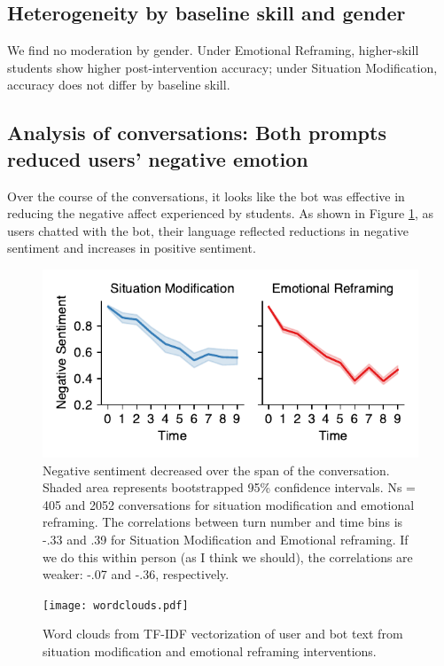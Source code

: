 \documentclass[11pt]{report}
\begin{document}
\begin{mainf}
\subsection{Heterogeneity by baseline skill and gender}

We find no moderation by gender. 
Under Emotional Reframing, higher-skill students show higher post-intervention accuracy; under Situation Modification, accuracy does not differ by baseline skill.

\subsection{Analysis of conversations: Both prompts reduced users' negative emotion}

Over the course of the conversations, it looks like the bot was effective in reducing the negative affect experienced by students. 
As shown in Figure \ref{fig:sentiment}, as users chatted with the bot, their language reflected reductions in negative sentiment and increases in positive sentiment.


\begin{figure}[ht]
    \centering
    \includegraphics[width=\linewidth]{sentiment.pdf}
    \caption{Negative sentiment decreased over the span of the conversation. Shaded area represents bootstrapped 95\% confidence intervals. Ns = 405 and 2052 conversations for situation modification and emotional reframing. The correlations between turn number and time bins is -.33 and .39 for Situation Modification and Emotional reframing. If we do this within person (as I think we should), the correlations are weaker: -.07 and -.36, respectively.}
    \label{fig:sentiment}
\end{figure}

\begin{figure}[ht]
    \centering
    \texttt{[image: wordclouds.pdf]}
    \caption{Word clouds from TF-IDF vectorization of user and bot text from situation modification and emotional reframing interventions.}
    \label{fig:wordclouds}
\end{figure}




\end{mainf}
\end{document}
